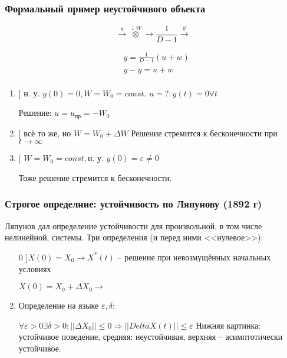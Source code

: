 \documentclass[main.tex]{subfiles}
\begin{document}
\subsubsection{Формальный пример неустойчивого объекта}

$$ \xrightarrow{u} \overset{\downarrow W}{\otimes} \rightarrow \boxed{\frac{1}{D-1}} \xrightarrow{y} $$

\begin{align*}
    & y = \frac{1}{D-1}(u+w) \\
    & \dot y - y = u + w \\
\end{align*}

\begin{enumerate}
    \item ] н. у. $y(0)=0, W=W_0=const$.
    $u=? : y(t)=0 \forall t$

    Решение: $ u = u_{\text{пр}} = - W_0 $

    \item ] всё то же, но $ W = W_0 + \Delta W $
    Решение стремится к бесконечности при $t \to \infty $

    \item ] $ W = W_0 = const, \text{н. у. } y(0) = \varepsilon \ne 0 $

    Тоже решение стремится к бесконечности.
\end{enumerate}

\subsubsection{Строгое определние: устойчивость по Ляпунову (1892 г)}

Ляпунов дал определение устойчивости для произвольной, в том числе нелинейной, системы.
Три определения (и перед ними <<нулевое>>):

\begin{enumerate}
    \item[0] $ ] X(0) = X_0 \to  X^*(t) $ -- решение при невозмущённых начальных условиях

    $ X(0) = X_0 + \Delta X_0 \to $ %
    \item Определение на языке $\varepsilon, \delta$:

    $ \forall \varepsilon > 0 \exists \delta > 0 : ||\Delta X_0|| \le 0 \Rightarrow ||Delta X(t)|| \le \varepsilon $
    Нижняя картинка: устойчивое поведение, средняя: неустойчивая, верхняя -- асимптотически устойчивое.
\end{enumerate}
\end{document}
